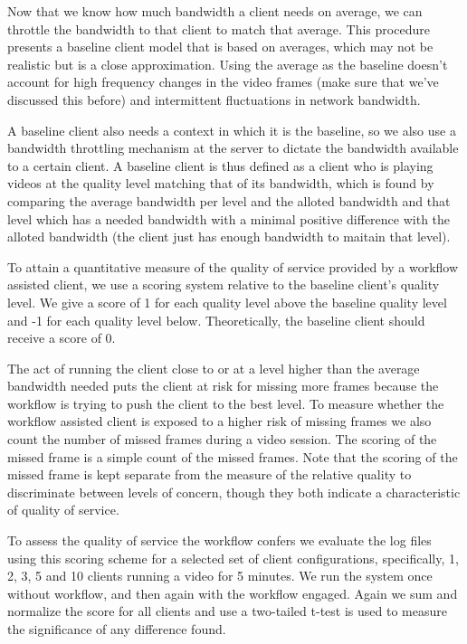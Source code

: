 \documentclass{sig-alternate}
\begin{document}
Now that we know how much bandwidth a client needs on average, we can
throttle the bandwidth to that client to match that average.  This
procedure presents a baseline client model that is based on averages,
which may not be realistic but is a close approximation.  Using the
average as the baseline doesn't account for high frequency changes in
the video frames (make sure that we've discussed this before) and
intermittent fluctuations in network bandwidth.

A baseline client also needs a context in which it is the baseline, so
we also use a bandwidth throttling mechanism \cite{shaperd} at the
server to dictate the bandwidth available to a certain client.  A
baseline client is thus defined as a client who is playing videos at
the quality level matching that of its bandwidth, which is found by
comparing the average bandwidth per level and the alloted bandwidth
and that level which has a needed bandwidth with a minimal positive
difference with the alloted bandwidth (the client just has enough
bandwidth to maitain that level).

To attain a quantitative measure of the quality of service provided by
a workflow assisted client, we use a scoring system relative to the
baseline client's quality level.  We give a score of 1 for each
quality level above the baseline quality level and -1 for each quality
level below.  Theoretically, the baseline client should receive a
score of 0.


The act of running the client close to or at a level higher than the
average bandwidth needed puts the client at risk for missing more
frames because the workflow is trying to push the client to the best
level.  To measure whether the workflow assisted client is exposed to
a higher risk of missing frames we also count the number of missed
frames during a video session.  The scoring of the missed frame is a
simple count of the missed frames.  Note that the scoring of the
missed frame is kept separate from the measure of the relative quality
to discriminate between levels of concern, though they both indicate a
characteristic of quality of service.

To assess the quality of service the workflow confers we evaluate the
log files using this scoring scheme for a selected set of client
configurations, specifically, 1, 2, 3, 5 and 10 clients running a
video for 5 minutes.  We run the system once without workflow, and
then again with the workflow engaged.  Again we sum and normalize the
score for all clients and use a two-tailed t-test is used to measure
the significance of any difference found.
\end{document}
